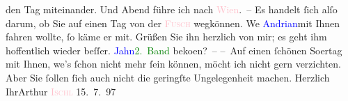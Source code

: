                     den Tag miteinander. Und Abend führe ich nach \textcolor{pink}{Wien}{}\ledrightnote{\textcolor{pink}{Wien}}. – Es handelt ſich alſo darum, ob Sie auf einen Tag von der \textcolor{pink}{\textsc{Fusch}}{}\ledrightnote{\textcolor{pink}{Bad Fusch}} wegkönnen. We{\geminationn}{ }\textcolor{blue}{Andrian}{}\ledrightnote{\textcolor{blue}{Leopold von Andrian-Werburg}}{ }{\pb}mit Ihnen fahren wollte, ſo käme er mit. Grüßen Sie
                    ihn herzlich von mir; es geht ihm hoffentlich wieder beſſer.\pend
           \pstart
           \textcolor{blue}{Jahn}{}\ledrightnote{\textcolor{blue}{Otto Jahn}}{ }\textcolor{green}{2. Band}{} beko{\geminationm}en? –\pend
           \pstart
           – Auf einen ſchönen So{\geminationm}ertag mit Ihnen, we{\geminationn}’s ſchon nicht mehr ſein können, möcht ich nicht
                    gern verzichten. Aber Sie ſollen ſich auch nicht die geringſte {\pb}Ungelegenheit machen.\pend
           \pstart Herzlich Ihr\spacefill\mbox{Arthur}\pend{}\pstart
           \textsc{\textcolor{pink}{Ischl}{}\ledrightnote{\textcolor{pink}{Bad Ischl}}}{ }15. 7. 97\pend
           \endnumbering{}  
      
